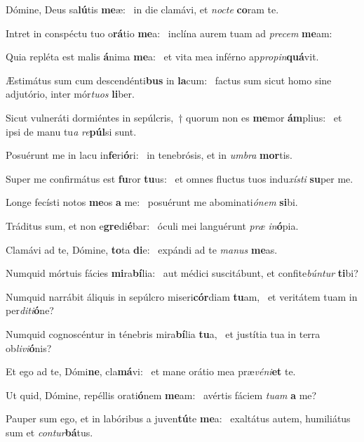 \item Dómine, Deus sa\textbf{lú}tis \textbf{me}æ:~\psstar{} in die clamávi, et \textit{nocte} \textbf{co}ram te.
\item Intret in conspéctu tuo o\textbf{rá}tio \textbf{me}a:~\psstar{} inclína aurem tuam ad \textit{precem} \textbf{me}am:
\item Quia repléta est malis \textbf{á}nima \textbf{me}a:~\psstar{} et vita mea inférno ap\textit{propin}\textbf{quá}vit.
\item Æstimátus sum cum descendénti\textbf{bus} in \textbf{la}cum:~\psstar{} factus sum sicut homo sine adjutório, inter mór\textit{tuos} \textbf{li}ber.
\item Sicut vulneráti dormiéntes in sepúlcris,~† quorum non es \textbf{me}mor \textbf{ám}plius:~\psstar{} et ipsi de manu tu\textit{a} \textit{re}\textbf{púl}si sunt.
\item Posuérunt me in lacu in\textbf{fe}ri\textbf{ó}ri:~\psstar{} in tenebrósis, et in \textit{umbra} \textbf{mor}tis.
\item Super me confirmátus est \textbf{fu}ror \textbf{tu}us:~\psstar{} et omnes fluctus tuos indu\textit{xísti} \textbf{su}per me.
\item Longe fecísti notos \textbf{me}os \textbf{a} me:~\psstar{} posuérunt me abominati\textit{ónem} \textbf{si}bi.
\item Tráditus sum, et non e\textbf{gre}di\textbf{é}bar:~\psstar{} óculi mei languérunt \textit{præ} \textit{in}\textbf{ó}pia.
\item Clamávi ad te, Dómine, \textbf{to}ta \textbf{di}e:~\psstar{} expándi ad te \textit{manus} \textbf{me}as.
\item Numquid mórtuis fácies \textbf{mi}ra\textbf{bí}lia:~\psstar{} aut médici suscitábunt, et confite\textit{búntur} \textbf{ti}bi?
\item Numquid narrábit áliquis in sepúlcro miseri\textbf{cór}diam \textbf{tu}am,~\psstar{} et veritátem tuam in per\textit{diti}\textbf{ó}ne?
\item Numquid cognoscéntur in ténebris mira\textbf{bí}lia \textbf{tu}a,~\psstar{} et justítia tua in terra ob\textit{livi}\textbf{ó}nis?
\item Et ego ad te, Dómi\textbf{ne}, cla\textbf{má}vi:~\psstar{} et mane orátio mea præ\textit{véni}\textbf{et} te.
\item Ut quid, Dómine, repéllis orati\textbf{ó}nem \textbf{me}am:~\psstar{} avértis fáciem \textit{tuam} \textbf{a} me?
\item Pauper sum ego, et in labóribus a juven\textbf{tú}te \textbf{me}a:~\psstar{} exaltátus autem, humiliátus sum et \textit{contur}\textbf{bá}tus.
